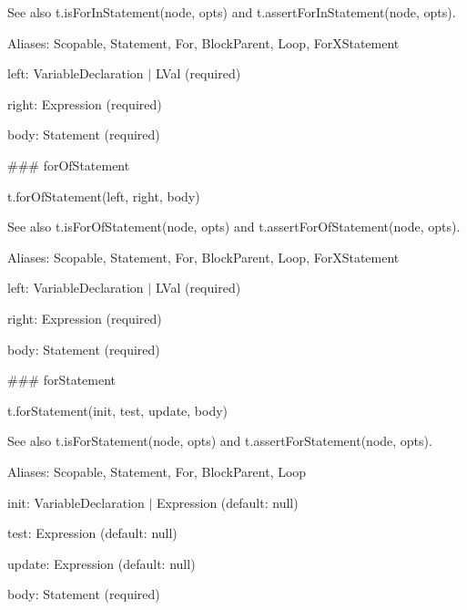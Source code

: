 See also {\ttfamily t.\+is\+For\+In\+Statement(node, opts)} and {\ttfamily t.\+assert\+For\+In\+Statement(node, opts)}.

Aliases\+: {\ttfamily Scopable}, {\ttfamily Statement}, {\ttfamily For}, {\ttfamily Block\+Parent}, {\ttfamily Loop}, {\ttfamily For\+X\+Statement}


\begin{DoxyItemize}
\item {\ttfamily left}\+: {\ttfamily Variable\+Declaration $\vert$ L\+Val} (required)
\item {\ttfamily right}\+: {\ttfamily Expression} (required)
\item {\ttfamily body}\+: {\ttfamily Statement} (required) 


\end{DoxyItemize}

\#\#\# for\+Of\+Statement 
\begin{DoxyCode}
t.forOfStatement(left, right, body)
\end{DoxyCode}


See also {\ttfamily t.\+is\+For\+Of\+Statement(node, opts)} and {\ttfamily t.\+assert\+For\+Of\+Statement(node, opts)}.

Aliases\+: {\ttfamily Scopable}, {\ttfamily Statement}, {\ttfamily For}, {\ttfamily Block\+Parent}, {\ttfamily Loop}, {\ttfamily For\+X\+Statement}


\begin{DoxyItemize}
\item {\ttfamily left}\+: {\ttfamily Variable\+Declaration $\vert$ L\+Val} (required)
\item {\ttfamily right}\+: {\ttfamily Expression} (required)
\item {\ttfamily body}\+: {\ttfamily Statement} (required) 


\end{DoxyItemize}

\#\#\# for\+Statement 
\begin{DoxyCode}
t.forStatement(init, test, update, body)
\end{DoxyCode}


See also {\ttfamily t.\+is\+For\+Statement(node, opts)} and {\ttfamily t.\+assert\+For\+Statement(node, opts)}.

Aliases\+: {\ttfamily Scopable}, {\ttfamily Statement}, {\ttfamily For}, {\ttfamily Block\+Parent}, {\ttfamily Loop}


\begin{DoxyItemize}
\item {\ttfamily init}\+: {\ttfamily Variable\+Declaration $\vert$ Expression} (default\+: {\ttfamily null})
\item {\ttfamily test}\+: {\ttfamily Expression} (default\+: {\ttfamily null})
\item {\ttfamily update}\+: {\ttfamily Expression} (default\+: {\ttfamily null})
\item {\ttfamily body}\+: {\ttfamily Statement} (required) 


\end{DoxyItemize}

